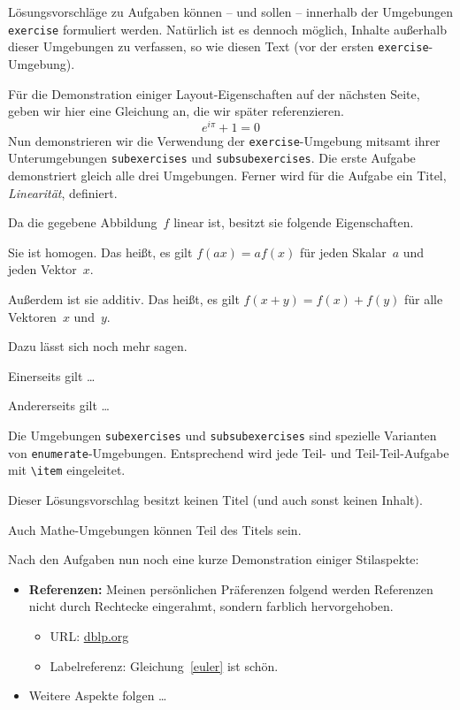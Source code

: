 \documentclass{myclass}
\begin{document}
	Lösungsvorschläge zu Aufgaben können -- und sollen -- innerhalb der Umgebungen \texttt{exercise} formuliert werden. Natürlich ist es dennoch möglich, Inhalte außerhalb dieser Umgebungen zu verfassen, so wie diesen Text (vor der ersten \texttt{exercise}-Umgebung).

	Für die Demonstration einiger Layout-Eigenschaften auf der nächsten Seite, geben wir hier eine Gleichung an, die wir später referenzieren.
	\begin{equation}
		\label{euler}
		e^{i\pi} + 1 = 0
	\end{equation}
	Nun demonstrieren wir die Verwendung der \texttt{exercise}-Umgebung mitsamt ihrer Unterumgebungen \texttt{subexercises} und \texttt{subsubexercises}. Die erste Aufgabe demonstriert gleich alle drei Umgebungen. Ferner wird für die Aufgabe ein Titel, \emph{Linearität}, definiert.
	\begin{exercise}[title=Linearität]
		Da die gegebene Abbildung~$f$ linear ist, besitzt sie folgende Eigenschaften.
		\begin{subexercises}
		\item Sie ist homogen. Das heißt, es gilt $f(ax) = af(x)$ für jeden Skalar~$a$ und jeden Vektor~$x$.
		\item Außerdem ist sie additiv. Das heißt, es gilt $f(x+y) = f(x) + f(y)$ für alle Vektoren~$x$ und~$y$.

			Dazu lässt sich noch mehr sagen.
			\begin{subsubexercises}
			\item Einerseits gilt \dots
			\item Andererseits gilt \dots
			\end{subsubexercises}
		\end{subexercises}
	\end{exercise}
	Die Umgebungen \texttt{subexercises} und \texttt{subsubexercises} sind spezielle Varianten von \texttt{enumerate}-Umgebungen. Entsprechend wird jede Teil- und Teil-Teil-Aufgabe mit \verb+\item+ eingeleitet.
	\begin{exercise}
		Dieser Lösungsvorschlag besitzt keinen Titel (und auch sonst keinen Inhalt).
	\end{exercise}
	\begin{exercise}[title={$\log(e^x) = x$}]
		Auch Mathe-Umgebungen können Teil des Titels sein.
	\end{exercise}
	Nach den Aufgaben nun noch eine kurze Demonstration einiger Stilaspekte:
	\begin{itemize}
		\item \textbf{Referenzen:} Meinen persönlichen Präferenzen folgend werden Referenzen nicht durch Rechtecke eingerahmt, sondern farblich hervorgehoben.
			\begin{itemize}
				\item URL: \url{dblp.org}
				\item Labelreferenz: Gleichung~\eqref{euler} ist schön.
			\end{itemize}
		\item Weitere Aspekte folgen \dots
	\end{itemize}
\end{document}
